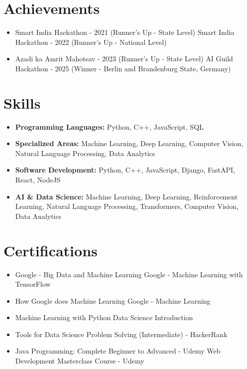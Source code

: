\documentclass[a4paper,10pt]{article}
\begin{document}
\section*{Achievements}
\begin{itemize}
\item Smart India Hackathon - 2021 (Runner's Up - State Level) \hfill Smart India Hackathon - 2022 (Runner's Up - National Level)
\item Azadi ka Amrit Mahotsav - 2023 (Runner's Up - State Level) \hfill AI Guild Hackathon - 2025 (Winner - Berlin and Brandenburg State, Germany)
\end{itemize}

\section*{Skills}
\begin{itemize}
  \item \textbf{Programming Languages:} Python, C++, JavaScript, SQL
  \item \textbf{Specialized Areas:} Machine Learning, Deep Learning, Computer Vision, Natural Language Processing, Data Analytics
  \item \textbf{Software Development:} Python, C++, JavaScript, Django, FastAPI, React, NodeJS
  \item \textbf{AI \& Data Science:} Machine Learning, Deep Learning, Reinforcement Learning, Natural Language Processing, Transformers, Computer Vision, Data Analytics
\end{itemize}

\section*{Certifications}
\begin{itemize}
\item Google - Big Data and Machine Learning \hfill Google - Machine Learning with TensorFlow
\item How Google does Machine Learning \hfill Google - Machine Learning
\item Machine Learning with Python \hfill Data Science Introduction
\item Tools for Data Science \hfill Problem Solving (Intermediate) - HackerRank
\item Java Programming: Complete Beginner to Advanced - Udemy \hfill Web Development Masterclass Course - Udemy
\end{itemize}
\end{document}
